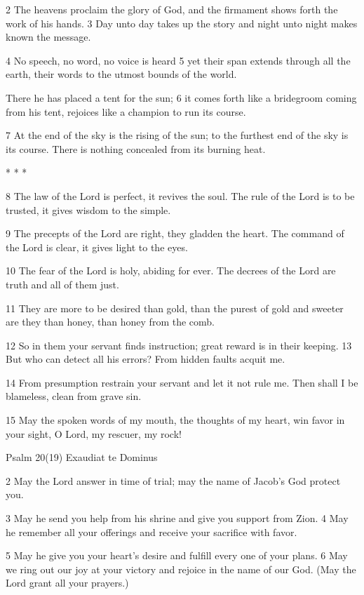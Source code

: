 2 The heavens proclaim the glory of God,
and the firmament shows forth the work of his hands.
3 Day unto day takes up the story
and night unto night makes known the message.

4 No speech, no word, no voice is heard
5 yet their span extends through all the earth,
their words to the utmost bounds of the world.

There he has placed a tent for the sun;
6 it comes forth like a bridegroom coming from his tent,
rejoices like a champion to run its course.

7 At the end of the sky is the rising of the sun;
to the furthest end of the sky is its course.
There is nothing concealed from its burning heat.

* * *

8 The law of the Lord is perfect,
it revives the soul.
The rule of the Lord is to be trusted,
it gives wisdom to the simple.

9 The precepts of the Lord are right,
they gladden the heart.
The command of the Lord is clear,
it gives light to the eyes.

10 The fear of the Lord is holy,
abiding for ever.
The decrees of the Lord are truth
and all of them just.

11 They are more to be desired than gold,
than the purest of gold
and sweeter are they than honey,
than honey from the comb.

12 So in them your servant finds instruction;
great reward is in their keeping.
13 But who can detect all his errors?
From hidden faults acquit me.

14 From presumption restrain your servant
and let it not rule me.
Then shall I be blameless,
clean from grave sin.

15 May the spoken words of my mouth,
the thoughts of my heart,
win favor in your sight, O Lord,
my rescuer, my rock!



Psalm 20(19) Exaudiat te Dominus

2 May the Lord answer in time of trial;
may the name of Jacob's God protect you.

3 May he send you help from his shrine
and give you support from Zion.
4 May he remember all your offerings
and receive your sacrifice with favor.

5 May he give you your heart's desire
and fulfill every one of your plans.
6 May we ring out our joy at your victory
and rejoice in the name of our God.
(May the Lord grant all your prayers.)

